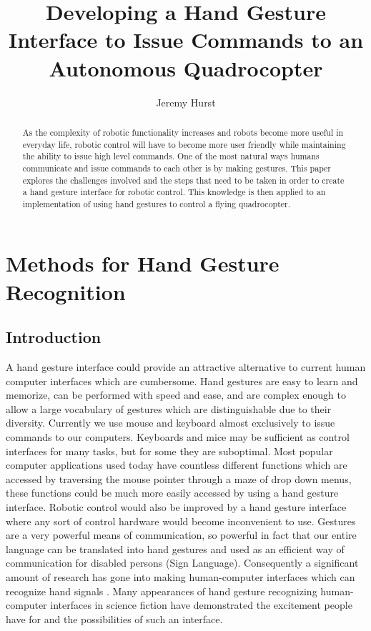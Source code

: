 \documentclass[a4paper,12pt]{report}
\title{Developing a Hand Gesture Interface to Issue Commands to an Autonomous Quadrocopter}
\author{Jeremy Hurst}
\begin{document}
\maketitle

\begin{abstract}
As the complexity of robotic functionality increases and robots become more useful in everyday life, robotic control will have to become more user friendly while maintaining the ability to issue high level commands. One of the most natural ways humans communicate and issue commands to each other is by making gestures. This paper explores the challenges involved and the steps that need to be taken in order to create a hand gesture interface for robotic control. This knowledge is then applied to an implementation of using hand gestures to control a flying quadrocopter.


\end{abstract}
\tableofcontents
\newpage
\maketitle

\section{Methods for Hand Gesture Recognition}

\subsection{Introduction}

A hand gesture interface could provide an attractive alternative to current human computer interfaces which are cumbersome. Hand gestures are easy to learn and memorize, can be performed with speed and ease, and are complex enough to  allow a large vocabulary of gestures which are distinguishable due to their diversity.  Currently we use mouse and keyboard almost exclusively to issue commands to our computers. Keyboards and mice may be sufficient as control interfaces for many tasks, but for some they are suboptimal. Most popular computer applications used today have countless different functions which are accessed by traversing the mouse pointer through a maze of drop down menus, these functions could be much more easily accessed by using a hand gesture interface. Robotic control would also be improved by a hand gesture interface where any sort of control hardware would become inconvenient to use.   
Gestures are a very powerful means of communication, so powerful in fact that our entire language can be translated into hand gestures and used as an efficient way of communication for disabled persons (Sign Language). Consequently a significant amount of research has gone into making human-computer interfaces which can recognize hand signals \cite{1} \cite{2}. Many appearances of hand gesture recognizing human-computer interfaces in science fiction have demonstrated the excitement people have for and the possibilities of such an interface. 
\end{document}
